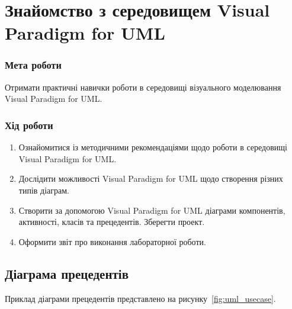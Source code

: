 


\newcommand{\labnumber}{1} %



\usepackage{../packages/tikz-uml}

\graphicspath{{figures/}}


\Ukrainian


\addtocounter{page}{1}

\section*{Знайомство з середовищем Visual Paradigm for UML}
\subsubsection*{Мета роботи}
Отримати практичні навички роботи в середовищі візуального моделювання Visual Paradigm for UML.
\subsubsection*{Хід роботи}
\begin{enumerate}
\item Ознайомитися із методичними рекомендаціями щодо роботи в середовищі Visual Paradigm for UML.
\item Дослідити можливості Visual Paradigm for UML щодо створення різних типів діаграм.
\item Створити за допомогою Visual Paradigm for UML діаграми компонентів, активності, класів та прецедентів. 
Зберегти проект.
\item Оформити звіт про виконання лабораторної роботи.
\end{enumerate}

\subsection{Діаграма прецедентів}
Приклад діаграми прецедентів представлено на рисунку~\ref{fig:uml_usecase}.

